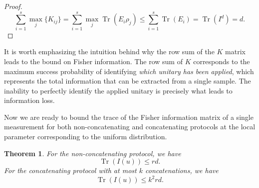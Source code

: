 \documentclass[12pt]{article}
\newtheorem{theorem}{Theorem}
\begin{document}
\begin{proof}
\begin{equation}
    \sum_{i=1}^s \max_j \{K_{ij}\} 
    = \sum_{i=1}^s \max_j{\operatorname{Tr}(E_i\rho_j)} 
    \leq \sum_{i=1}^s \operatorname{Tr}(E_i) 
    = \operatorname{Tr}(I^d) = d.
\end{equation}
\end{proof}

It is worth emphasizing the intuition behind why the row sum of the $K$ matrix leads to the bound on Fisher information. The row sum of $K$ corresponds to the maximum success probability of identifying \emph{which unitary has been applied}, which represents the total information that can be extracted from a single sample. The inability to perfectly identify the applied unitary is precisely what leads to information loss.

Now we are ready to bound the trace of the Fisher information matrix of a single measurement for both non-concatenating and concatenating protocols at the local parameter corresponding to the uniform distribution.

\begin{theorem}\label{th:trFI}
For the non-concatenating protocol, we have
\begin{equation}\label{eq:trInonc}
    \operatorname{Tr}(I(u)) \le r d.
\end{equation}
For the concatenating protocol with at most $k$ concatenations, we have
\begin{equation}\label{eq:trIc}
    \operatorname{Tr}(I(u)) \le k^2 r d.
\end{equation}
\end{theorem}
\end{document}
